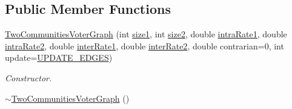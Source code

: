 \subsection*{Public Member Functions}
\begin{DoxyCompactItemize}
\item 
\hyperlink{class_two_communities_voter_graph_a37456a72e366202f8193a9f1935c69a3}{Two\+Communities\+Voter\+Graph} (int \hyperlink{class_two_communities_voter_graph_a3c9db0ac7e58d875ab3ce277bf74b284}{size1}, int \hyperlink{class_two_communities_voter_graph_a8b88457f020773b984e0d8c85d9ee502}{size2}, double \hyperlink{class_two_communities_voter_graph_a96a32ba7529177a7f6b73e827a57791e}{intra\+Rate1}, double \hyperlink{class_two_communities_voter_graph_a6e7ea06e014d75b7bf18441885e07e1e}{intra\+Rate2}, double \hyperlink{class_two_communities_voter_graph_af08c3b9a6e6f1dc8659a38ecd2d1afde}{inter\+Rate1}, double \hyperlink{class_two_communities_voter_graph_afab8bb5994f7fd1370d7d81caf7277d4}{inter\+Rate2}, double contrarian=0, int update=\hyperlink{voter__graph_8hpp_ab3bec55c359e4ed771339c8bc61fc35aa01d100088352e1a7d3a34c9a66d0f951}{U\+P\+D\+A\+T\+E\+\_\+\+E\+D\+G\+E\+S})
\begin{DoxyCompactList}\small\item\em Constructor. \end{DoxyCompactList}\item 
\hypertarget{class_two_communities_voter_graph_ab74e186e76188e7de8ae11359ad1e55e}{}\hyperlink{class_two_communities_voter_graph_ab74e186e76188e7de8ae11359ad1e55e}{$\sim$\+Two\+Communities\+Voter\+Graph} ()\label{class_two_communities_voter_graph_ab74e186e76188e7de8ae11359ad1e55e}


\end{DoxyCompactItemize}
